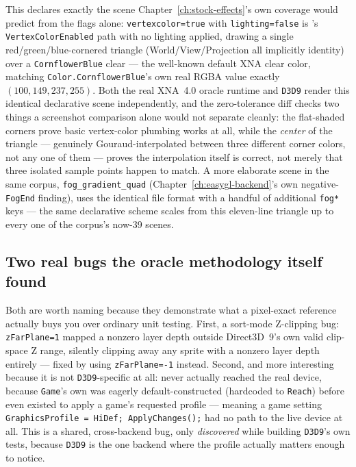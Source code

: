 This declares exactly the scene Chapter~\ref{ch:stock-effects}'s own 
coverage would predict from the flags alone: \texttt{vertexcolor=true} with
\texttt{lighting=false} is 's \texttt{VertexColorEnabled} path with no
lighting applied, drawing a single red/green/blue-cornered triangle (World/View/Projection all
implicitly identity) over a \texttt{CornflowerBlue} clear --- the well-known default XNA clear
color, matching \texttt{Color.CornflowerBlue}'s own real RGBA value exactly
$(100, 149, 237, 255)$. Both the real XNA~4.0 oracle runtime and \texttt{D3D9} render this
identical declarative scene independently, and the zero-tolerance diff checks two things a
screenshot comparison alone would not separate cleanly: the flat-shaded corners prove basic
vertex-color plumbing works at all, while the \emph{center} of the triangle --- genuinely
Gouraud-interpolated between three different corner colors, not any one of them --- proves the
interpolation itself is correct, not merely that three isolated sample points happen to match.
A more elaborate scene in the same corpus, \texttt{fog\_gradient\_quad}
(Chapter~\ref{ch:easygl-backend}'s own negative-\texttt{FogEnd} finding), uses the identical
file format with a handful of additional \texttt{fog*} keys --- the same declarative scheme
scales from this eleven-line triangle up to every one of the corpus's now-39 scenes.

\subsection{Two real bugs the oracle methodology itself found}

Both are worth naming because they demonstrate what a pixel-exact reference actually buys
you over ordinary unit testing. First, a sort-mode Z-clipping bug: \texttt{zFarPlane=1}
mapped a nonzero  layer depth outside Direct3D~9's own valid clip-space
Z range, silently clipping away any sprite with a nonzero layer depth entirely --- fixed by
using \texttt{zFarPlane=-1} instead. Second, and more interesting because it is not
\texttt{D3D9}-specific at all:  never actually reached the real
device, because \texttt{Game}'s own  was eagerly default-constructed
(hardcoded to \texttt{Reach}) before  even existed to apply a
game's requested profile --- meaning a game setting \texttt{GraphicsProfile = HiDef;
ApplyChanges();} had no path to the live device at all. This is a shared, cross-backend bug,
only \emph{discovered} while building \texttt{D3D9}'s own tests, because \texttt{D3D9} is the
one backend where the profile actually matters enough to notice.

